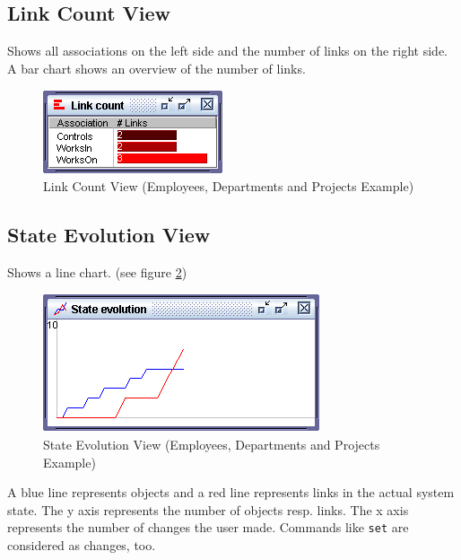 \documentclass[a4paper,titlepage,oneside,final]{scrreprt} %
\begin{document}
\subsection{Link Count View}\label{linkcountview}
Shows all associations on the left side and the number of links
on the right side. A bar chart shows an overview of the number of links.
\begin{figure}[ht]
\centering
\includegraphics[scale=0.7]{Screenshots/GUI/Views/LinkCountView.png}
\caption{Link Count View (Employees, Departments and Projects Example)}
\label{fig:LinkCountView}
\end{figure}
\subsection{State Evolution View}\label{stateevolutionview}
Shows a line chart. (see figure \ref{fig:StateEvolutionView})
\begin{figure}[ht]
\centering
\includegraphics[scale=0.7]{Screenshots/GUI/Views/StateEvolutionView.png}
\caption{State Evolution View (Employees, Departments and Projects Example)}
\label{fig:StateEvolutionView}
\end{figure}
A blue line represents objects and
a red line represents links in the actual system state.
The y axis represents the number of
objects resp. links. The x axis represents the number of changes the user
made. Commands like \verb+set+ are considered as changes, too.
\end{document}
